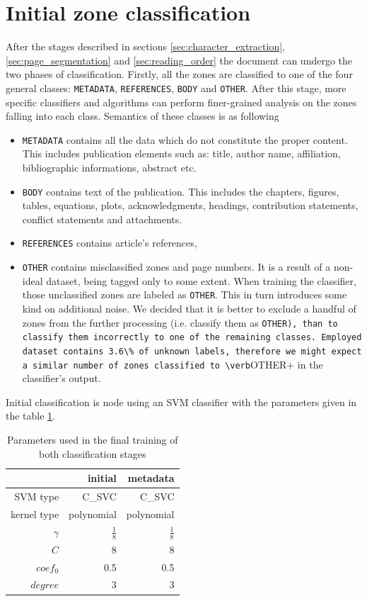 \section{Initial zone classification}
After the stages described in sections \ref{sec:character_extraction}, \ref{sec:page_segmentation} and \ref{sec:reading_order} the document can undergo the two phases of classification. Firstly, all the zones are classified to one of the four general classes: \verb+METADATA+, \verb+REFERENCES+, \verb+BODY+ and \verb+OTHER+. After this stage, more specific classifiers and algorithms can perform finer-grained analysis on the zones falling into each class. Semantics of these classes is as following
\begin{itemize}
\item \verb+METADATA+ contains all the data which do not constitute the proper content. This includes publication elements such as: title, author name, affiliation, bibliographic informations, abstract etc.
\item \verb+BODY+ contains text of the publication. This includes the chapters, figures, tables, equations, plots, acknowledgments, headings, contribution statements, conflict statements and attachments.
\item \verb+REFERENCES+ contains article's references,
\item \verb+OTHER+ contains misclassified zones and page numbers. It is a result of a non-ideal dataset, being tagged only to some extent. When training the classifier, those unclassified zones are labeled as \verb+OTHER+. This in turn introduces some kind on additional noise. We decided that it is better to exclude a handful of zones from the further processing (i.e. classify them as \verb+OTHER), than to classify them incorrectly to one of the remaining classes. Employed dataset contains 3.6\% of unknown labels, therefore we might expect a similar number of zones classified to \verb+OTHER+ in the classifier's output.
\end{itemize}
\quad
Initial classification is node using an SVM classifier with the parameters given in the table \ref{tab:classifier_parameters}.
\begin{table}
\centering
\begin{tabular}{@{}rrr@{}}
\toprule
& initial & metadata \\
\midrule
SVM type & C\_SVC & C\_SVC \\ 
kernel type & polynomial & polynomial \\
$\gamma$ & $\frac{1}{8}$ & $\frac{1}{8}$ \\ 
$C$ & 8 & 8 \\
$coef_0$ & 0.5 & 0.5 \\
$degree$ & 3 & 3 \\
\bottomrule
\end{tabular}
\label{tab:classifier_parameters}
\caption{Parameters used in the final training of both classification stages}
\end{table} 
